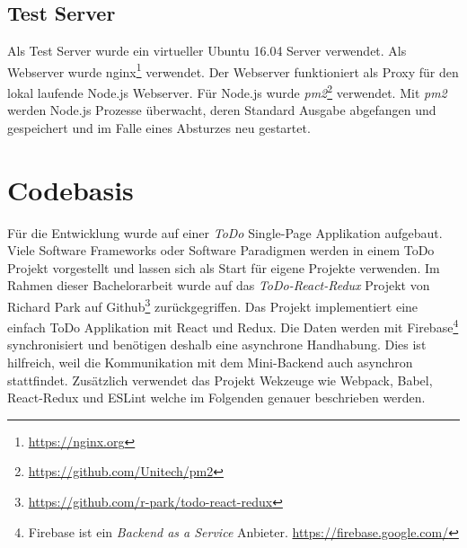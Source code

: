 \subsection{Test Server}
Als Test Server wurde ein virtueller Ubuntu 16.04 Server verwendet. Als Webserver wurde nginx\footnote{\url{https://nginx.org}} verwendet. Der Webserver funktioniert als Proxy für den lokal laufende Node.js Webserver. Für Node.js wurde \textit{pm2}\footnote{\url{https://github.com/Unitech/pm2}} verwendet. Mit \textit{pm2} werden Node.js Prozesse überwacht, deren Standard Ausgabe abgefangen und gespeichert und im Falle eines Absturzes neu gestartet.

\section{Codebasis}
Für die Entwicklung wurde auf einer \textit{ToDo} Single-Page Applikation aufgebaut. Viele Software Frameworks oder Software Paradigmen werden in einem ToDo Projekt vorgestellt und lassen sich als Start für eigene Projekte verwenden. Im Rahmen dieser Bachelorarbeit wurde auf das \textit{ToDo-React-Redux} Projekt von Richard Park auf Github\footnote{\url{https://github.com/r-park/todo-react-redux}} zurückgegriffen. Das Projekt implementiert eine einfach ToDo Applikation mit React und Redux. Die Daten werden mit Firebase\footnote{Firebase ist ein \textit{Backend as a Service} Anbieter. \url{https://firebase.google.com/}} synchronisiert und benötigen deshalb eine asynchrone Handhabung. Dies ist hilfreich, weil die Kommunikation mit dem Mini-Backend auch asynchron stattfindet. Zusätzlich verwendet das Projekt Wekzeuge wie Webpack, Babel, React-Redux und ESLint welche im Folgenden genauer beschrieben werden.

